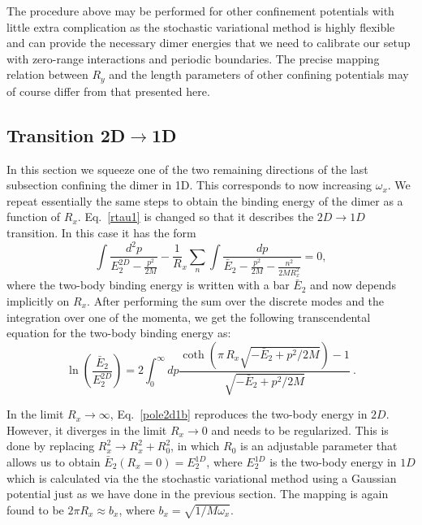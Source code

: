 \documentclass[twocolumn,showpacs,aps,prl,10pt]{revtex4}
\begin{document}
The procedure above may be performed for other confinement potentials with 
little extra complication as the stochastic variational method is highly flexible \cite{mitroy2013}
and can provide the necessary dimer energies that we need to calibrate our setup with 
zero-range interactions and periodic boundaries. The precise mapping relation 
between $R_y$ and the length parameters of other confining potentials may of course 
differ from that presented here. 


\subsection{Transition 2D$\rightarrow$1D}
In this section we squeeze one of the two remaining directions of the last subsection 
confining the dimer in 1D. This corresponds to now increasing $\omega_x$. 
We repeat essentially the same steps to obtain the binding energy of the 
dimer as a function of $R_x$. Eq.~\eqref{rtau1} is changed so that it describes the $2D\to1D$ 
transition. In this case it has the form
\begin{equation}
\int  
\frac{d^2p}{E_2^{2D}-\frac{p^2}{2M}}- 
\frac1R_x\sum_n\int\frac{dp}{\bar E_2-\frac{p^2}{2M}-\frac{n^2}{2MR_x^2}}=0,
\label{rtauab1da}
\end{equation}
where the two-body binding energy is written with a bar 
$\bar E_2$ and now depends implicitly on $R_x$.
After performing the sum over the discrete modes and the integration 
over one of the momenta, we get the following transcendental equation 
for the two-body binding energy as:
\begin{equation}
\ln\left(\frac{\bar E_2}{E_2^{2D}}\right)
 =2\int^\infty_{0}dp\frac{\coth (\pi\, R_x \sqrt{-\bar E_2+p^2/2M})-1}{\sqrt{-\bar E_2+p^2/2M}}
\ . \label{pole2d1b}
\end{equation}  

In the limit $R_x\to\infty$, Eq.~\eqref{pole2d1b} reproduces the two-body energy in $2D$. However, 
it diverges in the limit $R_x\to0$ and needs to be regularized. This is 
done by replacing $R_x^2\to R_x^2+R_0^2$, in which $R_0$ is an adjustable 
parameter that allows us to obtain $\bar E_2(R_x=0)=E_2^{1D}$, where $E_2^{1D}$ is the two-body energy in $1D$
which is calculated via the the stochastic variational method using a Gaussian potential 
just as we have done in the previous section. The mapping is again found to be 
$2\pi R_x \approx b_x$, where $b_x=\sqrt{1/M\omega_x}$. 
\end{document}
